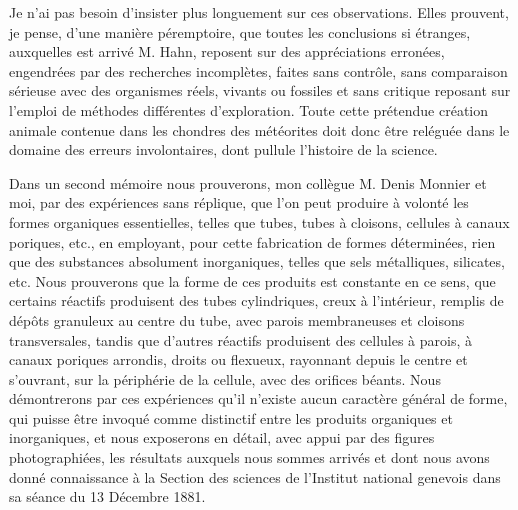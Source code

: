 \documentclass[a4paper, 12pt, oneside, french]{book}
\begin{document}
Je n'ai pas besoin d'insister plus longuement sur ces observations. Elles prouvent, je pense, d'une manière péremptoire, que toutes les conclusions si étranges, auxquelles est arrivé M. Hahn, reposent sur des appréciations erronées, engendrées par des recherches incomplètes, faites sans contrôle, sans comparaison sérieuse avec des organismes réels, vivants ou fossiles et sans critique reposant sur l'emploi de méthodes différentes d'exploration. Toute cette prétendue création animale contenue dans les chondres des météorites doit donc être reléguée dans le domaine des erreurs involontaires, dont pullule l'histoire de la science.

Dans un second mémoire nous prouverons, mon collègue M. Denis Monnier et moi, par des expériences sans réplique, que l'on peut produire à volonté les formes organiques essentielles, telles que tubes, tubes à cloisons, cellules à canaux poriques, etc., en employant, pour cette fabrication de formes déterminées, rien que des substances absolument inorganiques, telles que sels métalliques, silicates, etc. Nous prouverons que la forme de ces produits est constante en ce sens, que certains réactifs produisent des tubes cylindriques, creux à l'intérieur, remplis de dépôts granuleux au centre du tube, avec parois membraneuses et cloisons transversales, tandis que d'autres réactifs produisent des cellules à parois, à canaux poriques arrondis, droits ou flexueux, rayonnant depuis le centre et s'ouvrant, sur la périphérie de la cellule, avec des orifices béants. Nous démontrerons par ces expériences qu'il n'existe aucun caractère général de forme, qui puisse être invoqué comme distinctif entre les produits organiques et inorganiques, et nous exposerons en détail, avec appui par des figures photographiées, les résultats auxquels nous sommes arrivés et dont nous avons donné connaissance à la Section des sciences de l'Institut national genevois dans sa séance du 13 Décembre 1881.
\end{document}
